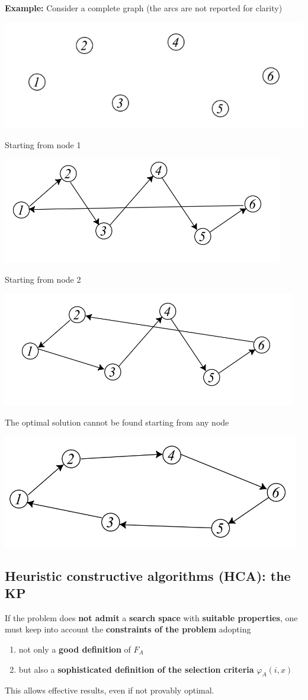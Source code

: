 \textbf{Example:} Consider a complete graph (the arcs are not reported for clarity)
\begin{center}
	\includegraphics[width=0.5\columnwidth]{img/NNTSP1}
\end{center}
Starting from node 1 
\begin{center}
	\includegraphics[width=0.5\columnwidth]{img/NNTSP2}
\end{center}
Starting from node 2
\begin{center}
	\includegraphics[width=0.5\columnwidth]{img/NNTSP3}
\end{center}
The optimal solution cannot be found starting from any node
\begin{center}
	\includegraphics[width=0.5\columnwidth]{img/NNTSP4}
\end{center}

\newpage

\subsection{Heuristic constructive algorithms (HCA): the KP}
If the problem does \textbf{not admit} a \textbf{search space} with \textbf{suitable properties}, one must keep into account the \textbf{constraints of the problem} adopting
\begin{enumerate}
	\item not only a \textbf{good definition} of $F_A$
	\item but also a \textbf{sophisticated definition of the selection criteria} $\varphi_A (i, x)$
\end{enumerate}
This allows effective results, even if not provably optimal.\\

